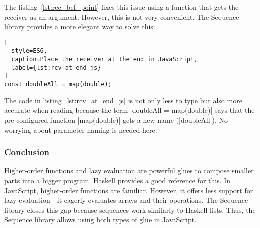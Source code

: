 The listing~\ref{lst:rec_bef_point} fixes this issue using a function that gets
the receiver as an argument. However, this is not very convenient. The Sequence
library provides a more elegant way to solve this:

\begin{lstlisting}[
  style=ES6,
  caption=Place the receiver at the end in JavaScript,
  label={lst:rcv_at_end_js}
]
const doubleAll = map(double);
\end{lstlisting}

The code in listing~\ref{lst:rcv_at_end_js} is not only less to type but also
more accurate when reading because the term |doubleAll = map(double)| says that
the pre-configured function |map(double)| gets a new name (|doubleAll|). No worrying about
parameter naming is needed here.

\subsubsection{Conclusion} %
\label{subsub:modularizing_programs_conclusion}
Higher-order functions and lazy evaluation are powerful glues to compose
smaller parts into a bigger program. Haskell provides a good reference for
this. In JavaScript, higher-order functions are familiar. However, it
offers less support for lazy evaluation - it eagerly evaluates arrays and their
operations. The Sequence library closes this gap because sequences work
similarly to Haskell lists. Thus, the Sequence library allows using both types
of glue in JavaScript.
